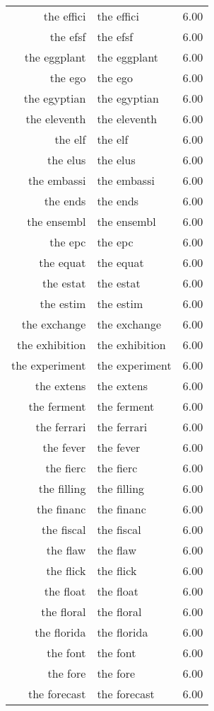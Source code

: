 \begin{table}[ht]
\begin{tabular}{rlr}
  the effici & the effici & 6.00 \\ 
  the efsf & the efsf & 6.00 \\ 
  the eggplant & the eggplant & 6.00 \\ 
  the ego & the ego & 6.00 \\ 
  the egyptian & the egyptian & 6.00 \\ 
  the eleventh & the eleventh & 6.00 \\ 
  the elf & the elf & 6.00 \\ 
  the elus & the elus & 6.00 \\ 
  the embassi & the embassi & 6.00 \\ 
  the ends & the ends & 6.00 \\ 
  the ensembl & the ensembl & 6.00 \\ 
  the epc & the epc & 6.00 \\ 
  the equat & the equat & 6.00 \\ 
  the estat & the estat & 6.00 \\ 
  the estim & the estim & 6.00 \\ 
  the exchange & the exchange & 6.00 \\ 
  the exhibition & the exhibition & 6.00 \\ 
  the experiment & the experiment & 6.00 \\ 
  the extens & the extens & 6.00 \\ 
  the ferment & the ferment & 6.00 \\ 
  the ferrari & the ferrari & 6.00 \\ 
  the fever & the fever & 6.00 \\ 
  the fierc & the fierc & 6.00 \\ 
  the filling & the filling & 6.00 \\ 
  the financ & the financ & 6.00 \\ 
  the fiscal & the fiscal & 6.00 \\ 
  the flaw & the flaw & 6.00 \\ 
  the flick & the flick & 6.00 \\ 
  the float & the float & 6.00 \\ 
  the floral & the floral & 6.00 \\ 
  the florida & the florida & 6.00 \\ 
  the font & the font & 6.00 \\ 
  the fore & the fore & 6.00 \\ 
  the forecast & the forecast & 6.00 \\ 

\end{tabular}
\end{table}
